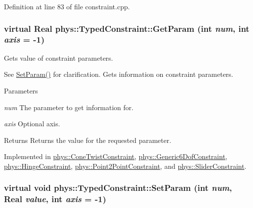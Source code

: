 Definition at line 83 of file constraint.cpp.

\hypertarget{classphys_1_1TypedConstraint_ab6140d40e9476c3dc46e2802e8097421}{
\subsubsection[{GetParam}]{\setlength{\rightskip}{0pt plus 5cm}virtual {\bf Real} phys::TypedConstraint::GetParam (int {\em num}, \/  int {\em axis} = {\ttfamily -\/1})}}
\label{d1/d17/classphys_1_1TypedConstraint_ab6140d40e9476c3dc46e2802e8097421}


Gets value of constraint parameters. 

See \hyperlink{classphys_1_1TypedConstraint_a31a20a74094f0cb8e4f82d1f99725415}{SetParam()} for clarification. Gets information on constraint parameters. 
\begin{DoxyParams}{Parameters}
\item[{\em num}]The parameter to get information for. \item[{\em axis}]Optional axis. \end{DoxyParams}
\begin{DoxyReturn}{Returns}
Returns the value for the requested parameter. 
\end{DoxyReturn}


Implemented in \hyperlink{classphys_1_1ConeTwistConstraint_aab54f6c56622cef4314d3bbff194421e}{phys::ConeTwistConstraint}, \hyperlink{classphys_1_1Generic6DofConstraint_a822152201f9bd6d0a3e1512fa25b3f49}{phys::Generic6DofConstraint}, \hyperlink{classphys_1_1HingeConstraint_a7e8c001ee6291bf457c9860124cacaf8}{phys::HingeConstraint}, \hyperlink{classphys_1_1Point2PointConstraint_a0f58e2b57a463fe6fe44e7b3192fc3b7}{phys::Point2PointConstraint}, and \hyperlink{classphys_1_1SliderConstraint_a181393c2beec42bdebf7d1a17dfe7593}{phys::SliderConstraint}.

\hypertarget{classphys_1_1TypedConstraint_a31a20a74094f0cb8e4f82d1f99725415}{
\subsubsection[{SetParam}]{\setlength{\rightskip}{0pt plus 5cm}virtual void phys::TypedConstraint::SetParam (int {\em num}, \/  {\bf Real} {\em value}, \/  int {\em axis} = {\ttfamily -\/1})}}
\label{d1/d17/classphys_1_1TypedConstraint_a31a20a74094f0cb8e4f82d1f99725415}


